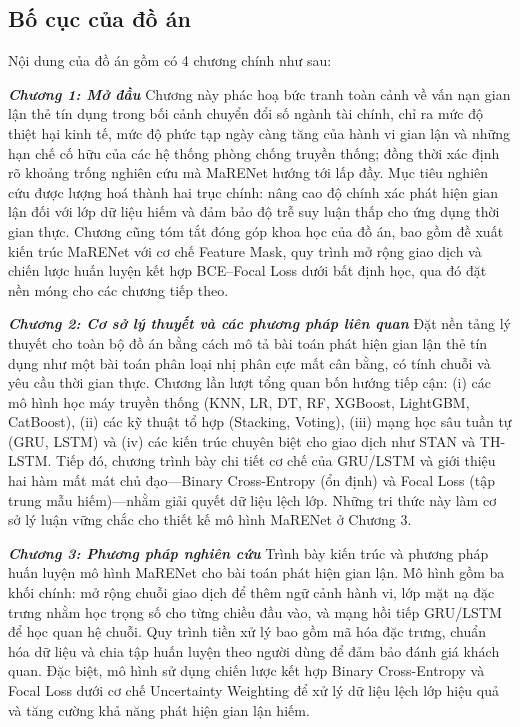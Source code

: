 \subsection*{Bố cục của đồ án}

Nội dung của đồ án gồm có 4 chương chính như sau:

\textit{\textbf{Chương 1: Mở đầu}}
Chương này phác hoạ bức tranh toàn cảnh về vấn nạn gian lận thẻ tín dụng trong bối cảnh chuyển đổi số ngành tài chính, chỉ ra mức độ thiệt hại kinh tế, mức độ phức tạp ngày càng tăng của hành vi gian lận và những hạn chế cố hữu của các hệ thống phòng chống truyền thống; đồng thời xác định rõ khoảng trống nghiên cứu mà MaRENet hướng tới lấp đầy. Mục tiêu nghiên cứu được lượng hoá thành hai trục chính: nâng cao độ chính xác phát hiện gian lận đối với lớp dữ liệu hiếm và đảm bảo độ trễ suy luận thấp cho ứng dụng thời gian thực. Chương cũng tóm tắt đóng góp khoa học của đồ án, bao gồm đề xuất kiến trúc MaRENet với cơ chế Feature Mask, quy trình mở rộng giao dịch và chiến lược huấn luyện kết hợp BCE–Focal Loss dưới bất định học, qua đó đặt nền móng cho các chương tiếp theo.

\textit{\textbf{Chương 2: Cơ sở lý thuyết và các phương pháp liên quan}}
Đặt nền tảng lý thuyết cho toàn bộ đồ án bằng cách mô tả bài toán phát hiện gian lận thẻ tín dụng như một bài toán phân loại nhị phân cực mất cân bằng, có tính chuỗi và yêu cầu thời gian thực. Chương lần lượt tổng quan bốn hướng tiếp cận: (i) các mô hình học máy truyền thống (KNN, LR, DT, RF, XGBoost, LightGBM, CatBoost), (ii) các kỹ thuật tổ hợp (Stacking, Voting), (iii) mạng học sâu tuần tự (GRU, LSTM) và (iv) các kiến trúc chuyên biệt cho giao dịch như STAN và TH-LSTM. Tiếp đó, chương trình bày chi tiết cơ chế của GRU/LSTM và giới thiệu hai hàm mất mát chủ đạo—Binary Cross-Entropy (ổn định) và Focal Loss (tập trung mẫu hiếm)—nhằm giải quyết dữ liệu lệch lớp. Những tri thức này làm cơ sở lý luận vững chắc cho thiết kế mô hình MaRENet ở Chương 3.

\textit{\textbf{Chương 3: Phương pháp nghiên cứu}}
Trình bày kiến trúc và phương pháp huấn luyện mô hình MaRENet cho bài toán phát hiện gian lận. Mô hình gồm ba khối chính: mở rộng chuỗi giao dịch để thêm ngữ cảnh hành vi, lớp mặt nạ đặc trưng nhằm học trọng số cho từng chiều đầu vào, và mạng hồi tiếp GRU/LSTM để học quan hệ chuỗi. Quy trình tiền xử lý bao gồm mã hóa đặc trưng, chuẩn hóa dữ liệu và chia tập huấn luyện theo người dùng để đảm bảo đánh giá khách quan. Đặc biệt, mô hình sử dụng chiến lược kết hợp Binary Cross-Entropy và Focal Loss dưới cơ chế Uncertainty Weighting để xử lý dữ liệu lệch lớp hiệu quả và tăng cường khả năng phát hiện gian lận hiếm.

